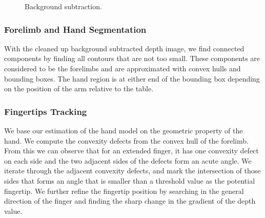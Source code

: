 \begin{figure}[h]
  \centering
  \caption{Background subtraction.} \label{fig:setup}
\end{figure}


\subsubsection{Forelimb and Hand Segmentation}
With the cleaned up background subtracted depth image, we find connected
components by finding all contours that are not too small. These components are
considered to be the forelimbs and are approximated with convex hulls and 
bounding boxes. The hand region is at either end of the bounding box depending
on the position of the arm relative to the table.

\subsubsection{Fingertips Tracking}
We base our estimation of the hand model on the geometric property of the
hand. We compute the convexity defects from the convex hull of the forelimb.
From this we can observe that for an extended finger, it has one convexity
defect on each side and the two adjacent sides of the defects form an
acute angle. We iterate through the adjacent convexity defects, and mark the
intersection of those sides that forms an angle that is smaller than a threshold
value as the potential fingertip. We further refine the fingertip position by
searching in the general direction of the finger and finding the sharp change in
the gradient of the depth value.


